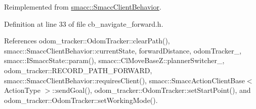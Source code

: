 Reimplemented from \hyperlink{classsmacc_1_1SmaccClientBehavior_a7962382f93987c720ad432fef55b123f}{smacc\+::\+Smacc\+Client\+Behavior}.



Definition at line 33 of file cb\+\_\+navigate\+\_\+forward.\+h.



References odom\+\_\+tracker\+::\+Odom\+Tracker\+::clear\+Path(), smacc\+::\+Smacc\+Client\+Behavior\+::current\+State, forward\+Distance, odom\+Tracker\+\_\+, smacc\+::\+I\+Smacc\+State\+::param(), smacc\+::\+Cl\+Move\+Base\+Z\+::planner\+Switcher\+\_\+, odom\+\_\+tracker\+::\+R\+E\+C\+O\+R\+D\+\_\+\+P\+A\+T\+H\+\_\+\+F\+O\+R\+W\+A\+RD, smacc\+::\+Smacc\+Client\+Behavior\+::requires\+Client(), smacc\+::\+Smacc\+Action\+Client\+Base$<$ Action\+Type $>$\+::send\+Goal(), odom\+\_\+tracker\+::\+Odom\+Tracker\+::set\+Start\+Point(), and odom\+\_\+tracker\+::\+Odom\+Tracker\+::set\+Working\+Mode().


